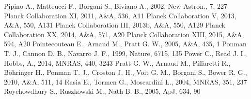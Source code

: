 \documentclass[a4paper,fleqn,usenatbib]{mnras}
\begin{document}
{\begin{thebibliography}{}
Pipino A., Matteucci F., Borgani S., Biviano A., 2002, New Astron., 7, 227
Planck Collaboration XI, 2011, A\&A, 536, A11
Planck Collaboration V, 2013, A\&A, 550, A131
Planck Collaboration III, 2013b, A\&A, 550, A129
Planck Collaboration XX, 2014, A\&A, 571, A20
Planck Collaboration XIII, 2015, A\&A, 594, A20
 Pointecouteau E., Arnaud M., Pratt G. W., 2005, A\&A, 435, 1
Ponman T. J., Cannon D. B., Navarro J. F., 1999, Nature, 6715, 135
Power C., Read J. I., Hobbs, A., 2014, MNRAS, 440, 3243
Pratt G. W., Arnaud M., Piffaretti R., B{\"o}hringer H., Ponman T. J., Croston J. H., Voit G. M., Borgani S., Bower R. G., 2010, A\&A, 511, 14
 Rasia E., Tormen G., Moscardini L., 2004, MNRAS, 351, 237
 Roychowdhury S., Ruszkowski M., Nath B. B., 2005, ApJ, 634, 90

\end{thebibliography}}
\end{document}
